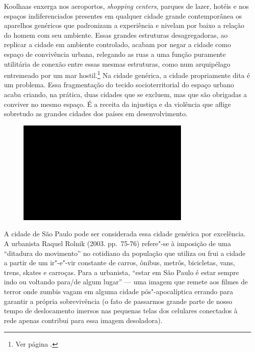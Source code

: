 Koolhaas enxerga nos aeroportos, \emph{shopping centers}, parques de lazer,
hotéis e nos espaços indiferenciados presentes em qualquer cidade grande
contemporânea os aparelhos genéricos que padronizam a experiência e
nivelam por baixo a relação do homem com seu ambiente. Essas grandes
estruturas desagregadoras, ao replicar a cidade em ambiente controlado, acabam por negar a cidade
como espaço de convivência urbana, relegando as ruas a uma função
puramente utilitária de conexão entre essas mesmas estruturas, como num
arquipélago entremeado por um mar hostil.\footnote{Ver página \pageref{hotel}.} Na cidade genérica, a cidade
propriamente dita é um problema. Essa fragmentação do tecido
socioterritorial do espaço urbano acaba criando, na prática, duas
cidades que se excluem, mas que são obrigadas a conviver no mesmo
espaço. É a receita da injustiça e da violência que aflige sobretudo as
grandes cidades dos países em desenvolvimento.

\begin{figure}[!ht]

\centering
 \includegraphics[width=85mm]{./imgs/im1.jpg}
\caption{\tiny{}}

\end{figure}

A cidade de São Paulo pode ser considerada essa cidade genérica por
excelência. A urbanista Raquel Rolnik (2003. pp.~75-76) refere"-se à imposição de uma
``ditadura do movimento'' no cotidiano da população que utiliza ou frui
a cidade a partir de um ir"-e"-vir constante de carros, ônibus, metrôs,
bicicletas, vans, trens, skates e carroças. Para a urbanista, ``estar em
São Paulo é estar sempre indo ou voltando para/de algum lugar'' --- uma
imagem que remete aos filmes de terror onde zumbis vagam em alguma
cidade pós"-apocalíptica errando para garantir a própria sobrevivência (o
fato de passarmos grande parte de nosso tempo de deslocamento imersos
nas pequenas telas dos celulares conectados à rede apenas contribui para
essa imagem desoladora).

